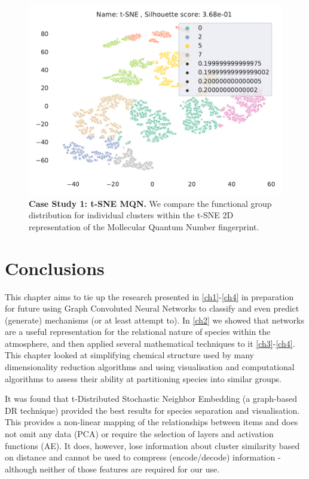 \begin{figure}[H]
    \centering
    \includegraphics[width=\textwidth]{outputs/t-SNE/mqn_all.pdf}
    \caption{\textbf{Case Study 1: t-SNE MQN.} We compare the functional group distribution for individual clusters within the t-SNE 2D representation of the Mollecular Quantum Number fingerprint.}
    \label{fig:tsnemqncase}
\end{figure}
\newpage

\section{Conclusions}

This chapter aims to tie up the research presented in \autoref{ch1}-\ref{ch4} in preparation for future using Graph Convoluted Neural Networks \citep{gcn} to classify and even predict (generate) mechanisms (or at least attempt to). In \autoref{ch2} we showed that networks are a useful representation for the relational nature of species within the atmosphere, and then applied several mathematical techniques to it \autoref{ch3}-\ref{ch4}. This chapter looked at simplifying chemical structure used by many dimensionality reduction algorithms and using visualisation and computational algorithms to assess their ability at partitioning species into similar groups.

It was found that t-Distributed Stochastic Neighbor Embedding (a graph-based DR technique) provided the best results for species separation and visualisation. This provides a non-linear mapping of the relationships between items and does not omit any data (PCA) or require the selection of layers and activation functions (AE). It does, however, lose information about cluster similarity based on distance and cannot be used to compress (encode/decode) information - although neither of those features are required for our use.

